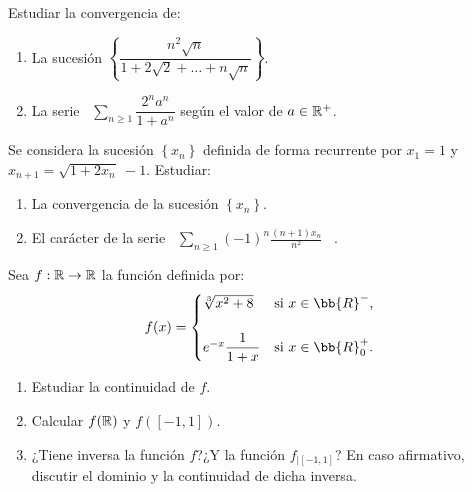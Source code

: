 \documentclass[12pt]{article}
\begin{document}
	\begin{ejercicio}[2 puntos] Estudiar la convergencia de:
		\begin{enumerate}
			\item La sucesión $\left\{\dfrac{n^2 \sqrt{n}}{1+2\sqrt{2}+ \dots + n\sqrt{n}}\right\}$.
			\item La serie \ $\displaystyle \sum\limits_{n\geq 1} \dfrac{2^na^n}{1+a^n}$ según el valor de $a \in {\mathbb{R}}^+$.
		\end{enumerate}
	\end{ejercicio}

	\begin{ejercicio}[2 puntos] Se considera la sucesión $\left\{x_n\right\}$ definida de forma recurrente por $x_1=1$ y $x_{n+1} = \sqrt{1+2x_n}~-1$. Estudiar:
		\begin{enumerate}
			\item La convergencia de la sucesión $\left\{x_n\right\}$.
			\item El carácter de la serie \ $\sum\limits_{n\geq 1} \left(-1\right)^n \frac{(n+1)x_n}{n^2}$ \ .
		\end{enumerate}
	\end{ejercicio}

	\begin{ejercicio}[3 puntos] Sea $f: {\mathbb{R}} \rightarrow {\mathbb{R}}$ la función definida por:
		\[
		f(x)=
		\begin{cases}
			\sqrt[3]{x^2+8} & \text{si $x \in \bb{R}^-$,} \\ \\
			e^{-x}\dfrac{1}{1+x} & \text{si $x \in \bb{R}_0^+$.}
		\end{cases}
		\]
		\begin{enumerate}
			\item Estudiar la continuidad de $f$.
			\item Calcular $f({\mathbb{R}})$ y $f([-1,1])$.
			\item ¿Tiene inversa la función $f$?¿Y la función $f_{\big| [-1,1]}$? En caso afirmativo, discutir el dominio y la continuidad de dicha inversa.
		\end{enumerate}		
	\end{ejercicio}
	
	\newpage
	\setcounter{ejercicio}{0} %
	
\end{document}
